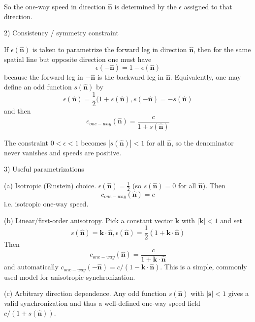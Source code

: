 \documentclass[a4paper]{article}
\theoremstyle{plain}
\theoremstyle{definition}
\newcommand{\vect}[1]{\mathbf{#1}}
\newcommand{\hatvec}[1]{\hat{\mathbf{#1}}}
\begin{document}
So the one-way speed in direction $\hatvec{n}$
is determined by the $\epsilon$ assigned to that direction.

2) Consistency / symmetry constraint

If $\epsilon(\hatvec{n})$
is taken to parametrize the forward leg in direction $\hatvec{n}$,
then for the same spatial line but opposite direction one must have
\begin{equation}
\epsilon(-\hatvec{n}) = 1 - \epsilon(\hatvec{n})
\end{equation}
because the forward leg in $-\hatvec{n}$
is the backward leg in $\hatvec{n}$.
Equivalently, one may define an odd function $s(\hatvec{n})$ by
\begin{equation}
\epsilon(\hatvec{n}) = \frac{1}{2}(1 + s(\hatvec{n}), s(-\hatvec{n}) = -s(\hatvec{n})
\end{equation}
and then
\begin{equation}
c_{one-way}(\hatvec{n}) = \frac{c}{1 + s(\hatvec{n})}
\end{equation}

The constraint $0 < \epsilon < 1$ becomes $|s(\hatvec{n})| < 1$
for all $\hatvec{n}$, so the denominator never vanishes
and speeds are positive.

3) Useful parametrizations

(a) Isotropic (Einstein) choice. $\epsilon(\hatvec{n}) = \frac{1}{2}$
(so $s(\hatvec{n})=0$ for all $\hatvec{n}$).  Then
\begin{equation}
c_{one-way}(\hatvec{n}) = c
\end{equation}
i.e. isotropic one-way speed.

(b) Linear/first-order anisotropy.  Pick a constant vector $\vect{k}$
with $|\vect{k}| < 1$ and set
\begin{equation}
s(\hatvec{n}) = \vect{k} \cdot \hatvec{n}, \epsilon(\hatvec{n}) = \frac{1}{2} (1 + \vect{k} \cdot \hatvec{n})
\end{equation}
Then
\begin{equation}
c_{one-way}(\hatvec{n}) = \frac{c}{1 + \vect{k} \cdot \hatvec{n}}
\end{equation}
and automatically
$c_{one-way}(-\hatvec{n}) = c / (1 - \vect{k} \cdot \hatvec{n})$.
This is a simple, commonly used model for anisotropic synchronization.

(c) Arbitrary direction dependence. Any odd function $s(\hatvec{n})$
with $|\vect{s}| < 1$ gives a valid synchronization
and thus a well-defined one-way speed field $c/(1+s(\hatvec{n}))$.
\end{document}

